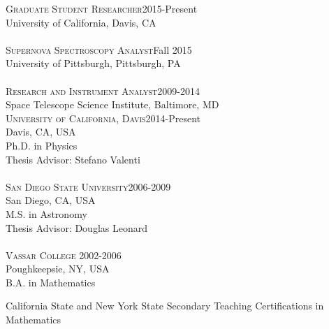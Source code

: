 \documentclass[10pt]{cv}
\begin{document}
\begin{llist}
\vspace{-0.1in}   
    \textsc{Graduate Student Researcher}\hfill2015-Present \\
    University of California, Davis, CA\\
\\
\textsc{Supernova Spectroscopy Analyst}\hfill Fall 2015\\ 
University of Pittsburgh, Pittsburgh, PA\\
\\
\textsc{Research and Instrument Analyst}\hfill 2009-2014 \\
Space Telescope Science Institute, Baltimore, MD\\

\vspace{-0.1in}   
\textsc{University of California, Davis}\hfill 2014-Present\\
Davis, CA, USA \\
Ph.D. in Physics \\
Thesis Advisor: Stefano Valenti \\
\\
\textsc{San Diego State University}\hfill 2006-2009\\
San Diego, CA, USA \\
M.S. in Astronomy \\
Thesis Advisor: Douglas Leonard \\
\\
\textsc{Vassar College} \hfill 2002-2006 \\
Poughkeepsie, NY, USA \\
B.A. in Mathematics \\
\begin{minipage}[l]{0.7\textwidth}\vspace{0.15cm}
California State and New York State Secondary Teaching Certifications in Mathematics \\
\end{minipage}


\end{llist}
\end{document}

